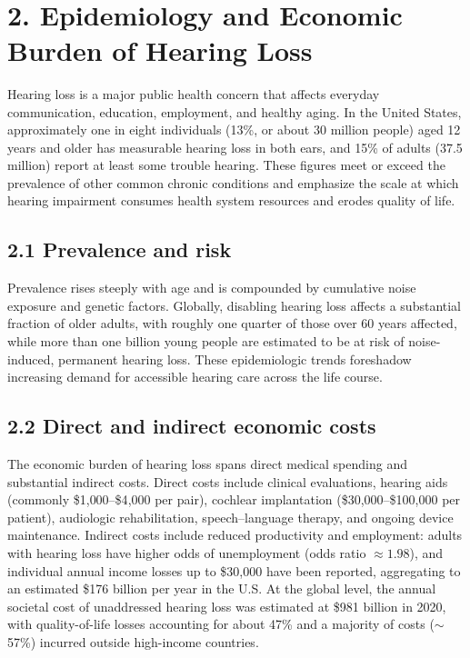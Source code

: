 \
\section*{2. Epidemiology and Economic Burden of Hearing Loss}

Hearing loss is a major public health concern that affects everyday communication, education, employment, and healthy aging. In the United States, approximately one in eight individuals (13\%, or about 30 million people) aged 12 years and older has measurable hearing loss in both ears, and 15\% of adults (37.5 million) report at least some trouble hearing.\cite{nidcd2021, cdc2010, cdc2021, wilson2014} These figures meet or exceed the prevalence of other common chronic conditions and emphasize the scale at which hearing impairment consumes health system resources and erodes quality of life.

\subsection*{2.1 Prevalence and risk}
Prevalence rises steeply with age and is compounded by cumulative noise exposure and genetic factors. Globally, disabling hearing loss affects a substantial fraction of older adults, with roughly one quarter of those over 60 years affected, while more than one billion young people are estimated to be at risk of noise-induced, permanent hearing loss.\cite{WHO2025} These epidemiologic trends foreshadow increasing demand for accessible hearing care across the life course.

\subsection*{2.2 Direct and indirect economic costs}
The economic burden of hearing loss spans direct medical spending and substantial indirect costs. Direct costs include clinical evaluations, hearing aids (commonly \$1{,}000--\$4{,}000 per pair), cochlear implantation (\$30{,}000--\$100{,}000 per patient), audiologic rehabilitation, speech--language therapy, and ongoing device maintenance. Indirect costs include reduced productivity and employment: adults with hearing loss have higher odds of unemployment (odds ratio \(\approx 1.98\)), and individual annual income losses up to \$30{,}000 have been reported, aggregating to an estimated \$176 billion per year in the U.S.\cite{SocietyCosts2000, Kim2020, Colburn2019, WHO2025} At the global level, the annual societal cost of unaddressed hearing loss was estimated at \$981 billion in 2020, with quality-of-life losses accounting for about 47\% and a majority of costs (\(\sim\)57\%) incurred outside high-income countries.\cite{McDaid2021}

